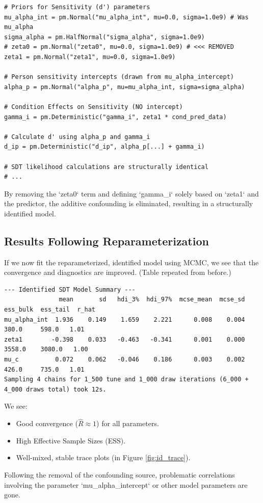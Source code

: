 \documentclass[12pt]{article}
\begin{document}
\begin{lstlisting}[label=lst:id_sdt_code, caption={PyMC code snippet for the identified SDT model parameters (removing $\zeta_0$).}]
# Priors for Sensitivity (d') parameters
mu_alpha_int = pm.Normal("mu_alpha_int", mu=0.0, sigma=1.0e9) # Was mu_alpha
sigma_alpha = pm.HalfNormal("sigma_alpha", sigma=1.0e9)
# zeta0 = pm.Normal("zeta0", mu=0.0, sigma=1.0e9) # <<< REMOVED
zeta1 = pm.Normal("zeta1", mu=0.0, sigma=1.0e9)

# Person sensitivity intercepts (drawn from mu_alpha_intercept)
alpha_p = pm.Normal("alpha_p", mu=mu_alpha_int, sigma=sigma_alpha)

# Condition Effects on Sensitivity (NO intercept)
gamma_i = pm.Deterministic("gamma_i", zeta1 * cond_pred_data)

# Calculate d' using alpha_p and gamma_i
d_ip = pm.Deterministic("d_ip", alpha_p[...] + gamma_i)

# SDT likelihood calculations are structurally identical
# ...
\end{lstlisting}
By removing the `zeta0` term and defining `gamma\_i` solely based on `zeta1` and the predictor, the additive confounding is eliminated, resulting in a structurally identified model.

\subsection*{Results Following Reparameterization}

If we now fit the reparameterized, identified model using MCMC, we see that the convergence and diagnostics are improved. (Table repeated from before.)

\footnotesize
\begin{verbatim}
--- Identified SDT Model Summary ---
               mean       sd   hdi_3%  hdi_97%  mcse_mean  mcse_sd  ess_bulk  ess_tail  r_hat
mu_alpha_int  1.936    0.149    1.659    2.221      0.008    0.004     380.0     598.0   1.01
zeta1        -0.398    0.033   -0.463   -0.341      0.001    0.000    3558.0    3080.0   1.00
mu_c          0.072    0.062   -0.046    0.186      0.003    0.002     426.0     735.0   1.01
Sampling 4 chains for 1_500 tune and 1_000 draw iterations (6_000 + 4_000 draws total) took 12s.
\end{verbatim}
\normalsize


We see:
\begin{itemize}[label=--, itemsep=1ex]
    \item Good convergence ($\hat{R} \approx 1$) for all parameters.
    \item High Effective Sample Sizes (ESS).
    \item Well-mixed, stable trace plots (in Figure \ref{fig:id_trace}).
\end{itemize}
Following the removal of the confounding source, problematic correlations involving the parameter `mu\_alpha\_intercept` or other model parameters are gone.
\end{document}
